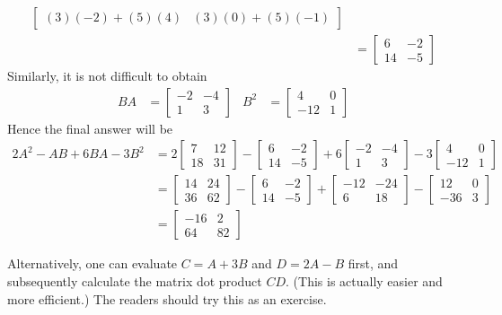 \begin{solution}
\begin{align*}
\begin{bmatrix}
(3)(-2)+(5)(4) & (3)(0)+(5)(-1) 
\end{bmatrix} \\
&= 
\begin{bmatrix}
6 & -2 \\
14 & -5 
\end{bmatrix}
\end{align*}
Similarly, it is not difficult to obtain
\begin{align*}
BA &= 
\begin{bmatrix}
-2 & -4 \\
1 & 3 
\end{bmatrix} &
B^2 &= 
\begin{bmatrix}
4 & 0 \\
-12 & 1 
\end{bmatrix} 
\end{align*}
Hence the final answer will be
\begin{align*}
2A^2 - AB + 6BA - 3B^2 &= 
2\begin{bmatrix}
7 & 12 \\
18 & 31 
\end{bmatrix}
-\begin{bmatrix}
6 & -2 \\
14 & -5 
\end{bmatrix}
+6\begin{bmatrix}
-2 & -4 \\
1 & 3 
\end{bmatrix}
-3\begin{bmatrix}
4 & 0 \\
-12 & 1 
\end{bmatrix} \\
&=
\begin{bmatrix}
14 & 24 \\
36 & 62 
\end{bmatrix}
-\begin{bmatrix}
6 & -2 \\
14 & -5 
\end{bmatrix}
+\begin{bmatrix}
-12 & -24 \\
6 & 18 
\end{bmatrix}
-\begin{bmatrix}
12 & 0 \\
-36 & 3 
\end{bmatrix} \\
&= 
\begin{bmatrix}
-16 & 2 \\
64 & 82 
\end{bmatrix}
\end{align*}
\end{solution}
Alternatively, one can evaluate $C = A+3B$ and $D = 2A-B$ first, and subsequently calculate the matrix dot product $CD$. (This is actually easier and more efficient.) The readers should try this as an exercise.

